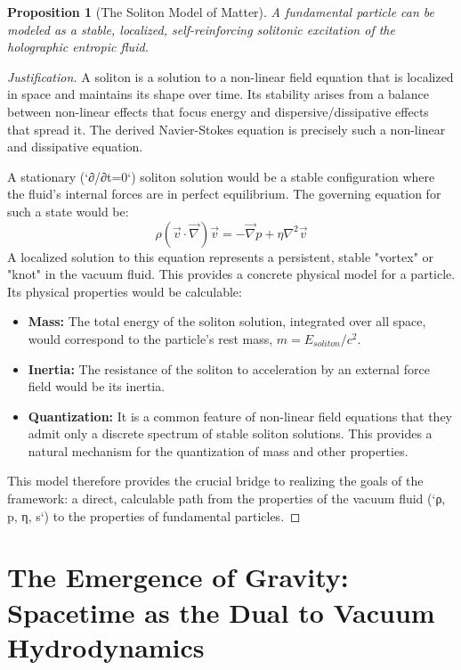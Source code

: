 \documentclass[11pt, letterpaper]{report}
\theoremstyle{plain} %
\newtheorem{proposition}[theorem]{Proposition}
\theoremstyle{definition} %
\theoremstyle{remark} %
\begin{document}
\begin{proposition}[The Soliton Model of Matter]
A fundamental particle can be modeled as a stable, localized, self-reinforcing solitonic excitation of the holographic entropic fluid.
\end{proposition}
\begin{proof}[Justification]
A soliton is a solution to a non-linear field equation that is localized in space and maintains its shape over time. Its stability arises from a balance between non-linear effects that focus energy and dispersive/dissipative effects that spread it. The derived Navier-Stokes equation is precisely such a non-linear and dissipative equation.

A stationary (`∂/∂t=0`) soliton solution would be a stable configuration where the fluid's internal forces are in perfect equilibrium. The governing equation for such a state would be:
\begin{equation}
    \rho (\vec{v}\cdot\vec{\nabla})\vec{v} = -\vec{\nabla}p + \eta \nabla^2\vec{v}
\end{equation}
A localized solution to this equation represents a persistent, stable "vortex" or "knot" in the vacuum fluid. This provides a concrete physical model for a particle. Its physical properties would be calculable:
\begin{itemize}
    \item \textbf{Mass:} The total energy of the soliton solution, integrated over all space, would correspond to the particle's rest mass, $m = E_{soliton}/c^2$.
    \item \textbf{Inertia:} The resistance of the soliton to acceleration by an external force field would be its inertia.
    \item \textbf{Quantization:} It is a common feature of non-linear field equations that they admit only a discrete spectrum of stable soliton solutions. This provides a natural mechanism for the quantization of mass and other properties.
\end{itemize}
This model therefore provides the crucial bridge to realizing the goals of the framework: a direct, calculable path from the properties of the vacuum fluid (`ρ, p, η, s`) to the properties of fundamental particles.
\end{proof}







\chapter{The Emergence of Gravity: Spacetime as the Dual to Vacuum Hydrodynamics}
\label{chap:emergent_gravity_hydro}
\end{document}
